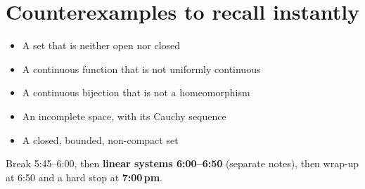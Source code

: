 \section*{Counterexamples to recall instantly}
\begin{itemize}[label=$\square$]
  \item A set that is neither open nor closed
  \item A continuous function that is not uniformly continuous
  \item A continuous bijection that is not a homeomorphism
  \item An incomplete space, with its Cauchy sequence
  \item A closed, bounded, non-compact set
\end{itemize}

\begin{examtip}[Next up]
Break 5:45--6:00, then \textbf{linear systems 6:00--6:50} (separate notes), then wrap-up at 6:50 and a hard stop at \textbf{7:00\,pm}.
\end{examtip}
